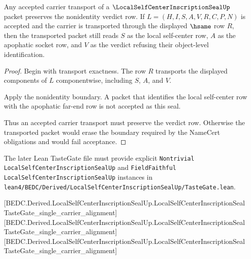 \begin{theorem}
\label{thm:local-self-center-inscription-seal-carrier-transport}
Any accepted carrier transport of a $\LocalSelfCenterInscriptionSealUp$ packet preserves the nonidentity verdict row. If $L=(H,I,S,A,V,R,C,P,N)$ is accepted and the carrier is transported through the displayed $\hsame$ row $R$, then the transported packet still reads $S$ as the local self-center row, $A$ as the apophatic socket row, and $V$ as the verdict refusing their object-level identification.
\end{theorem}
\begin{proof}
Begin with transport exactness. The row $R$ transports the displayed components of $L$ componentwise, including $S$, $A$, and $V$.

Apply the nonidentity boundary. A packet that identifies the local self-center row with the apophatic far-end row is not accepted as this seal.

Thus an accepted carrier transport must preserve the verdict row. Otherwise the transported packet would erase the boundary required by the NameCert obligations and would fail acceptance.
\end{proof}



The later Lean TasteGate file must provide explicit \texttt{Nontrivial LocalSelfCenterInscriptionSealUp} and \texttt{FieldFaithful LocalSelfCenterInscriptionSealUp} instances in \texttt{lean4/BEDC/Derived/LocalSelfCenterInscriptionSealUp/TasteGate.lean}.

[BEDC.Derived.LocalSelfCenterInscriptionSealUp.LocalSelfCenterInscriptionSealTasteGate\_single\_carrier\_alignment]
[BEDC.Derived.LocalSelfCenterInscriptionSealUp.LocalSelfCenterInscriptionSealTasteGate\_single\_carrier\_alignment]
[BEDC.Derived.LocalSelfCenterInscriptionSealUp.LocalSelfCenterInscriptionSealTasteGate\_single\_carrier\_alignment]

